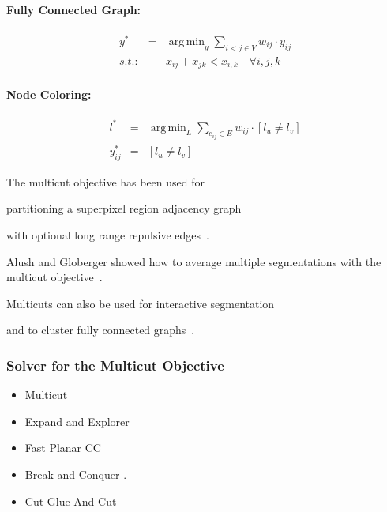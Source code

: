 \documentclass[10pt,twocolumn,letterpaper]{article}
\DeclareMathOperator*{\argmin}{arg\,min}
\begin{document}
\paragraph{Fully Connected Graph:}
\begin{center}
    \begin{eqnarray}
        y^*   & = & \argmin_{y} \sum_{ i<j \in V } w_{ij} \cdot y_{ij} \\
        s.t.: &  & x_{ij} + x_{jk} < x_{i,k} \quad \forall i, j, k   \nonumber
    \end{eqnarray}
\end{center}

\paragraph{Node Coloring:}
\begin{center}
    \begin{eqnarray}
        l^* &=& \argmin_{L} \sum_{ e_{ij} \in E } w_{ij} \cdot [l_{u} \neq l_{v}] \\
        y_{ij}^* &=& [l_{u} \neq l_{v}]  
    \end{eqnarray}
\end{center}

The multicut objective has been used for
\begin{inparaenum}[(i)]
    \item partitioning a superpixel region adjacency graph~\cite{andres_2011_iccv,kroeger_2012_eccv}
    \item with optional long range repulsive edges~\cite{yarknoy???}.
    \item Alush and Globerger showed how to average multiple segmentations with the multicut objective~\cite{alush_2012_pami}.
    \item Multicuts can also be used for interactive segmentation~\cite{bagon_2011_arxiv}
    \item and to cluster fully connected graphs~\cite{???}.
\end{inparaenum}


\subsubsection{Solver for the Multicut Objective}
    
    


   \begin{itemize}
   \item Multicut~\cite{kappes_2011_emmcvpr}
   \item Expand and Explorer~\cite{bagon_2011_arxiv}
   \item Fast Planar CC~\cite{yarkony_2012_eccv}
   \item Break and Conquer \cite{alush_2013_simbad}.
   \item Cut Glue And Cut~\cite{beier_2014_cvpr}
   \end{itemize}
\end{document}
